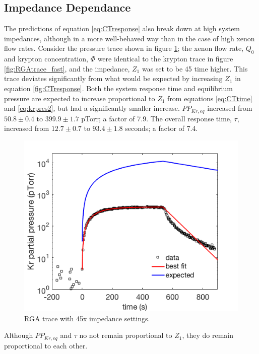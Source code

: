 \documentclass[12pt]{article}
\begin{document}
\subsection{Impedance Dependance}
The predictions of equation \ref{eq:CTresponse} also break down at high system impedances, although in a more well-behaved way than in the case of high xenon flow rates. Consider the pressure trace shown in figure \ref{fig:RGAtrace_slow}; the xenon flow rate, $Q_0$ and krypton concentration, $\Phi$ were identical to the krypton trace in figure \ref{fig:RGAtrace_fast}, and the impedance, $Z_1$ was set to be 45 time higher. This trace deviates significantly from what would be expected by increasing $Z_1$ in equation \ref{fig:CTresponse}. Both the system response time and equilibrium pressure are expected to increase proportional to $Z_1$ from equations \ref{eq:CTtime} and \ref{eq:krpres2}, but had a significantly smaller increase. $PP_{Kr,eq}$ increased from $50.8 \pm 0.4$ to $399.9\pm 1.7$ pTorr; a factor of 7.9. The overall response time, $\tau$, increased from $12.7 \pm 0.7$ to $93.4 \pm 1.8$ seconds; a factor of 7.4. 
\begin{figure}[h!]
\centering
\includegraphics[width=\textwidth]{Figures/RGAtrace_fit_slow_wexp.png}
\caption{RGA trace with 45x impedance settings. }
\label{fig:RGAtrace_slow}
\end{figure}

Although $PP_{Kr,eq}$ and $\tau$ no not remain proportional to $Z_1$, they do remain proportional to each other. 
\end{document}
